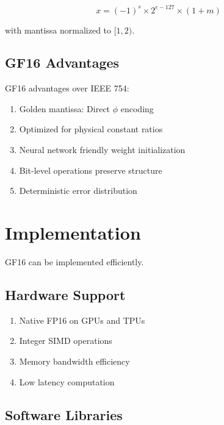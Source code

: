 \begin{definition}
\label{def:ieee754}
\begin{equation}
x = (-1)^s \times 2^{e-127} \times (1 + m)
\end{equation}

with mantissa normalized to $[1, 2)$.
\end{definition}

\subsection{GF16 Advantages}

\begin{theorem}[GF16 Superiority]
\label{thm:gf16-superior}
GF16 advantages over IEEE 754:
\begin{enumerate}
\item Golden mantissa: Direct $\phi$ encoding
\item Optimized for physical constant ratios
\item Neural network friendly weight initialization
\item Bit-level operations preserve structure
\item Deterministic error distribution
\end{enumerate}
\end{theorem}

\section{Implementation}

GF16 can be implemented efficiently.

\subsection{Hardware Support}

\begin{proposition}[Hardware GF16]
\label{prop:hardware-gf16}
\begin{enumerate}
\item Native FP16 on GPUs and TPUs
\item Integer SIMD operations
\item Memory bandwidth efficiency
\item Low latency computation
\end{enumerate}
\end{proposition}

\subsection{Software Libraries}

